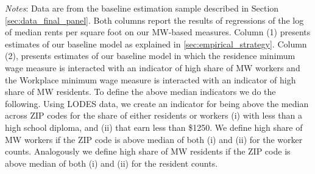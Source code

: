 \begin{table}[hbt!]
    \begin{minipage}{.95\textwidth} \footnotesize
        \vspace{2mm}
        \textit{Notes}: 
        Data are from the baseline estimation sample described in Section 
        \ref{sec:data_final_panel}.
        Both columns report the results of regressions of the log of 
        median rents per square foot on our MW-based measures.
        Column (1) presents estimates of our baseline model as explained in 
        \ref{sec:empirical_strategy}.
        Column (2), presents estimates of our baseline model in which the residence
        minimum wage measure is interacted with an indicator of high share of 
        MW workers and the Workplace minimum wage measure is interacted with an indicator
        of high share of MW residents.
        To define the above median indicators we do the following. Using LODES data, we 
        create an indicator for being above the median across ZIP codes for the share 
        of either residents or workers (i) with less than a high school diploma, and 
        (ii) that earn less than \$1250. We define high share of MW workers if the ZIP
        code is above median of both (i) and (ii) for the worker counts. Analogously we 
        define high share of MW residents if the ZIP code is above median of both (i) 
        and (ii) for the resident counts.
    \end{minipage}
\end{table}
